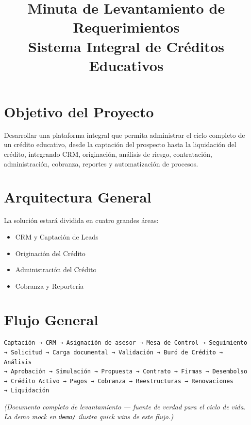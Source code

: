 \documentclass[11pt]{article}
\title{Minuta de Levantamiento de Requerimientos\\
Sistema Integral de Créditos Educativos}
\author{}
\date{}
\begin{document}
\maketitle
\tableofcontents
\newpage

\section{Objetivo del Proyecto}

Desarrollar una plataforma integral que permita administrar el ciclo completo de un crédito educativo, desde la captación del prospecto hasta la liquidación del crédito, integrando CRM, originación, análisis de riesgo, contratación, administración, cobranza, reportes y automatización de procesos.

\section{Arquitectura General}

La solución estará dividida en cuatro grandes áreas:

\begin{itemize}
\item CRM y Captación de Leads
\item Originación del Crédito
\item Administración del Crédito
\item Cobranza y Reportería
\end{itemize}

\section{Flujo General}

\begin{verbatim}
Captación → CRM → Asignación de asesor → Mesa de Control → Seguimiento
→ Solicitud → Carga documental → Validación → Buró de Crédito → Análisis
→ Aprobación → Simulación → Propuesta → Contrato → Firmas → Desembolso
→ Crédito Activo → Pagos → Cobranza → Reestructuras → Renovaciones
→ Liquidación
\end{verbatim}

\textit{(Documento completo de levantamiento — fuente de verdad para el ciclo de vida.
La demo mock en \texttt{demo/} ilustra quick wins de este flujo.)}
\end{document}

